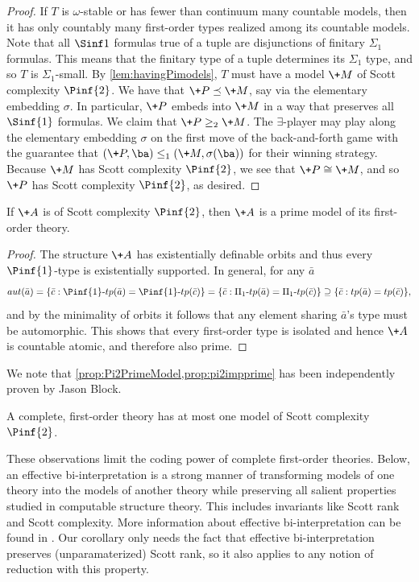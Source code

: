 \documentclass{amsart}
\renewcommand{\-}{\text{-}}
\begin{document}
\begin{proof}
If $T$ is $\omega$-stable or has fewer than continuum many countable models, then it has only countably many first-order types realized among its countable models.
Note that all $\Sinf1$ formulas true of a tuple are disjunctions of finitary $\Sigma_1$ formulas.
This means that the finitary type of a tuple determines its $\Sigma_1$ type, and so $T$ is $\Sigma_1$-small.
By \cref{lem:havingPimodels}, $T$ must have a model $\+M$ of Scott complexity $\Pinf{2}$.
We have that $\+P\preceq \+M$, say via the elementary embedding $\sigma$.
In particular, $\+P$ embeds into $\+M$ in a way that preserves all $\Sinf{1}$ formulas.
We claim that $\+P\geq_2\+M$.
The $\exists$-player may play along the elementary embedding $\sigma$ on the first move of the back-and-forth game with the guarantee that $(\+P,\ba)\leq_1(\+M,\sigma(\ba))$ for their winning strategy.
Because $\+M$ has Scott complexity $\Pinf{2}$, we see that $\+P\cong \+M$, and so $\+P$ has Scott complexity $\Pinf{2}$, as desired.
\end{proof}
%
\begin{proposition}\label{prop:pi2impprime}
  If $\+A$ is of Scott complexity $\Pinf{2}$, then $\+A$ is a prime model of its first-order theory.
\end{proposition}
\begin{proof}
  The structure $\+A$ has existentially definable orbits and thus every $\Pinf{1}$-type is existentially supported. In general, for any $\bar a$
  \[ aut(\bar a)=\{ \bar c: \Pinf{1}\-tp(\bar a)=\Pinf{1}\-tp(\bar c)\}=\{ \bar c: \Pi_{1}\-tp(\bar a)=\Pi_{1}\-tp(\bar c)\}\supseteq \{ \bar c: tp(\bar a)=tp(\bar c)\},\] 
  and by the minimality of orbits it follows that any element sharing $\bar a$'s type must be automorphic. This shows that every first-order type is isolated and hence $\+A$ is countable atomic, and therefore also prime.
\end{proof}
We note that \cref{prop:Pi2PrimeModel,prop:pi2impprime} has been independently proven by Jason Block.
\begin{corollary}
A complete, first-order theory has at most one model of Scott complexity $\Pinf{2}$.
\end{corollary}


These observations limit the coding power of complete first-order theories.
Below, an effective bi-interpretation is a strong manner of transforming models of one theory into the models of another theory while preserving all salient properties studied in computable structure theory.
This includes invariants like Scott rank and Scott complexity.
More information about effective bi-interpretation can be found in \cite[Chapter VI.4]{Part1}.
Our corollary only needs the fact that effective bi-interpretation preserves (unparamaterized) Scott rank, so it also applies to any notion of reduction with this property.
\end{document}
